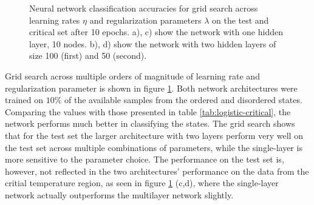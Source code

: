 \begin{figure}[h]
{	}
    \caption{
	Neural network classification accuracies for grid search across 
	learning rates $\eta$ and regularization parameters $\lambda$ on 
	the test and critical set after 10 epochs.
	a), c) show the network with one hidden layer, 10 nodes. 
	b), d) show the network with two hidden layers of size 100 (first) and 50
	(second). 
	}
    \label{fig:nn-grids}
\end{figure}
Grid search across multiple orders of magnitude of learning rate and
regularization parameter is shown in figure \ref{fig:nn-grids}. 
Both network architectures were trained on 
$10\%$ of the available samples from the ordered and disordered states.
Comparing the values with those presented in table \ref{tab:logistic-critical},
the network performs much better in classifying the states.
The grid search shows that for the test set the larger architecture with two layers
perform very well on the test set across multiple combinations of parameters,
while the single-layer is more sensitive to the parameter choice.
The performance on the test set is, however, not reflected in the two architectures'
performance on the data from the critial temperature region, as seen in figure 
\ref{fig:nn-grids} (c,d), where the single-layer network actually outperforms the
multilayer network slightly.
